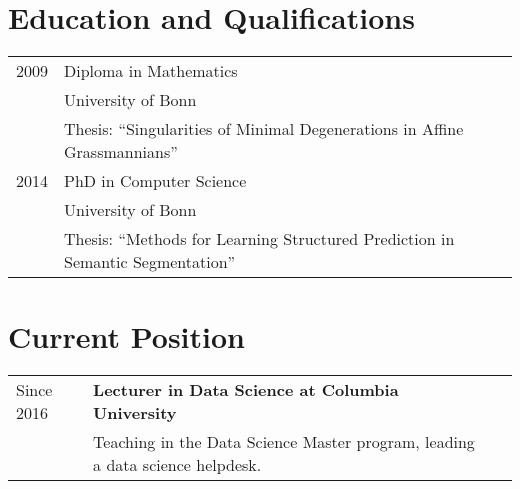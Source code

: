 \documentclass[a4paper,11pt]{article}
\begin{document}
\maketitle

\section{Education and Qualifications}
\begin{tabular}{lll}
    2009 & Diploma in Mathematics \\ & University of Bonn\\
         & Thesis: ``Singularities of Minimal Degenerations in Affine Grassmannians'' \\
    2014 & PhD in Computer Science \\ & University of Bonn \\
         & Thesis: ``Methods for Learning Structured Prediction in Semantic Segmentation''
\end{tabular}

\section{Current Position}
\begin{tabular}{lll}
    Since 2016 & \textbf{Lecturer in Data Science at Columbia University}\\
               & Teaching in the Data Science Master program, leading a data science helpdesk.\\
\end{tabular}
\end{document}
